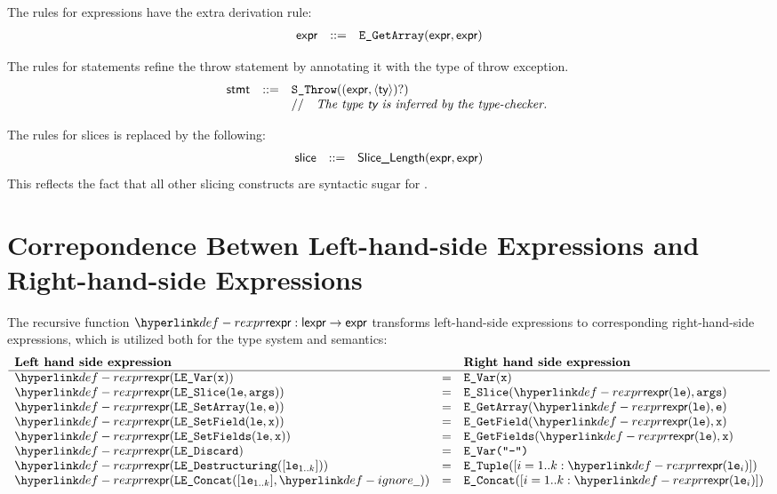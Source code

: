 \documentclass{book}
\begin{document}
The rules for expressions have the extra derivation rule:
\[
\begin{array}{rcl}
\textsf{expr} &::=& \texttt{E\_GetArray}(\textsf{expr}, \textsf{expr}) \\
\end{array}
\]

The rules for statements refine the throw statement by annotating it with
the type of throw exception.
\[
\begin{array}{rcl}
\textsf{stmt} &::=& \texttt{S\_Throw}((\textsf{expr}, \langle\textsf{ty}\rangle)?)\\
      & & //\quad\textit{The type $\textsf{ty}$ is inferred by the type-checker.}\ 
\end{array}
\]

The rules for slices is replaced by the following:
\[
\begin{array}{rcl}
\textsf{slice} &::=& \textsf{Slice\_Length}(\textsf{expr}, \textsf{expr}) \\
\end{array}
\]
This reflects the fact that all other slicing constructs are syntactic sugar
for \SliceLength.

\chapter{Correpondence Betwen Left-hand-side Expressions and Right-hand-side Expressions
\label{ch:LeftToRight}}

The recursive function $\torexpr : \lexpr \rightarrow \expr$ transforms
left-hand-side expressions to corresponding right-hand-side expressions,
which is utilized both for the type system and semantics:
\[
\begin{array}{lcl}
  \textbf{Left hand side expression} & & \textbf{Right hand side expression}\\
  \hline
  \torexpr(\texttt{LE\_Var}(\vx)) &=& \texttt{E\_Var}(\vx)\\
  \torexpr(\leslice(\vle, \vargs)) &=& \texttt{E\_Slice}(\torexpr(\vle), \vargs)\\
  \torexpr(\texttt{LE\_SetArray}(\vle, \ve)) &=& \texttt{E\_GetArray}(\torexpr(\vle), \ve)\\
  \torexpr(\texttt{LE\_SetField}(\vle, \vx)) &=& \texttt{E\_GetField}(\torexpr(\vle), \vx)\\
  \torexpr(\texttt{LE\_SetFields}(\vle, \vx)) &=& \texttt{E\_GetFields}(\torexpr(\vle), \vx)\\
  \torexpr(\texttt{LE\_Discard}) &=& \texttt{E\_Var("-")}\\
  \torexpr(\texttt{LE\_Destructuring}([\vle_{1..k}])) &=& \texttt{E\_Tuple}([i=1..k: \torexpr(\vle_i)])\\
  \torexpr(\texttt{LE\_Concat}([\vle_{1..k}], \Ignore)) &=& \texttt{E\_Concat}([i=1..k: \torexpr(\vle_i)])\\
\end{array}
\]
\end{document}
